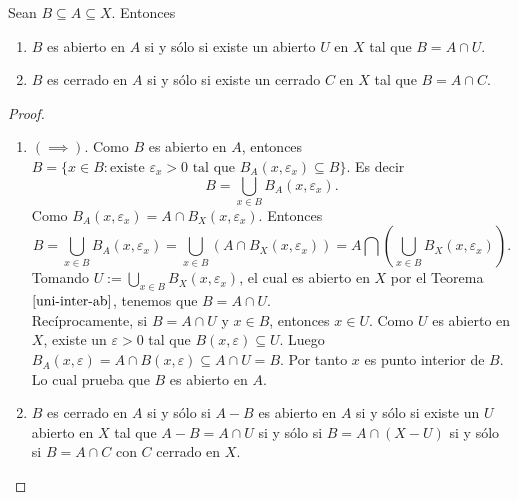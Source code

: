 \begin{teorema}\label{ab-cerr-subesp}
Sean $B\subseteq  A\subseteq X$. Entonces
\begin{enumerate}
    \item $B$ es abierto en $A$ si y sólo si existe un abierto $U$ en $X$ tal que $B=A\cap U$.
    \item  $B$ es cerrado en $A$ si y sólo si existe un cerrado $C$ en $X$ tal que $B=A\cap C$.
\end{enumerate}
\end{teorema}
\begin{proof}
\begin{enumerate}
    \item $(\implies)$. Como $B$ es abierto en $A$, entonces $B=\{x\in B: \text{existe $\varepsilon_x >0$ tal que $B_A(x, \varepsilon_x)\subseteq B$}\}$. Es decir
\[B=\bigcup_{x\in {B}}B_A(x, \varepsilon_x).\]
Como $B_A(x, \varepsilon_x) =A \cap B_X(x, \varepsilon_x).$ Entonces
\[B=\bigcup_{x\in B}B_A(x, \varepsilon_x) =\bigcup_{x\in B} \left( A \cap B_X(x, \varepsilon_x)\right)=A \bigcap  \left( \bigcup_{x\in B} B_X(x, \varepsilon_x)\right).\]
Tomando $U:=\bigcup_{x\in B} B_X(x, \varepsilon_x)$, el cual es abierto en $X$ por el Teorema $\ref{uni-inter-ab}$, tenemos que $B=A\cap U$.\\
Recíprocamente, si $B=A\cap U$ y $x\in B$, entonces $x\in U$. Como $U$ es abierto en $X$, existe un $\varepsilon>0$ tal que $B(x, \varepsilon)\subseteq U$. Luego $B_A(x, \varepsilon)=A\cap  B(x, \varepsilon) \subseteq A\cap U=B$. Por tanto $x$ es punto interior de $B$. Lo cual prueba que $B$ es abierto en $A$.
\item $B$ es cerrado en $A$ si y sólo si $A-B$ es abierto en $A$ si y sólo si existe un $U$ abierto en $X$ tal que $A-B=A\cap U$ si y sólo si $B=A\cap (X-U)$ si y sólo si $B=A\cap C$ con $C$ cerrado en $X$.
\end{enumerate}


\end{proof}
